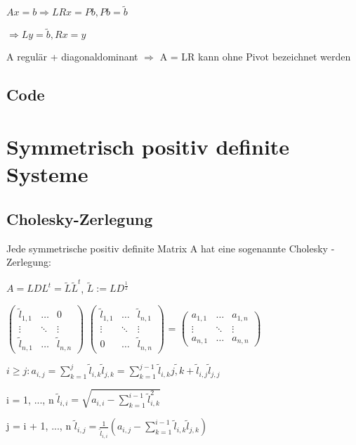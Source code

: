 \documentclass[12pt,a4paper]{article} %
\newcommand*\tab[1][1cm]{\hspace*{#1}}
\begin{document}
	$Ax = b \Rightarrow LRx = Pb, Pb = \tilde{b}$
	
	$\Rightarrow Ly = \tilde{b}, Rx = y$
	
	A regulär + diagonaldominant $\Rightarrow$ A = LR kann ohne Pivot bezeichnet werden
	
	\subsection{Code}
	
	\newpage
	
	\section{Symmetrisch positiv definite Systeme}
	
	\subsection{Cholesky-Zerlegung}
	
	Jede symmetrische positiv definite Matrix A hat eine sogenannte Cholesky - Zerlegung:
	
	$A = LDL^t = \tilde{L}\tilde{L}^t$, $\tilde{L} := LD^{\frac{1}{2}}$
	
	$\begin{pmatrix}
		\tilde{l}_{1,1} & \dots & 0 \\
		\vdots & \ddots & \vdots \\
		\tilde{l}_{n,1} & \dots & \tilde{l}_{n,n}
	\end{pmatrix}$
	$\begin{pmatrix}
		\tilde{l}_{1,1} & \dots & \tilde{l}_{n,1} \\
		\vdots & \ddots & \vdots \\
		0 & \dots & \tilde{l}_{n,n}
	\end{pmatrix}$
	=
	$\begin{pmatrix}
		a_{1,1} & \dots & a_{1, n} \\
		\vdots & \ddots & \vdots \\
		a_{n, 1} & \dots & a_{n, n}
	\end{pmatrix}$
	
	$i \ge j: a_{i, j} = \sum\limits_{k = 1}^j\tilde{l}_{i, k}\tilde{l}_{j, k} = \sum\limits_{k = 1}^{j - 1}\tilde{l}_{i, k}\tilde{j, k} + \tilde{l}_{i, j}\tilde{l}_{j, j}$
	
	i = 1, ..., n \tab $\tilde{l}_{i, i} = \sqrt{a_{i, i} - \sum\limits_{k = 1}^{i - 1}\tilde{l}_{i, k}^2}$
	
	j = i + 1, ..., n \tab $ \tilde{l}_{i, j} = \frac{1}{\tilde{l}_{i, i}}(a_{i, j} - \sum\limits_{k = 1}^{i - 1}\tilde{l}_{i, k}\tilde{l}_{j, k})$
	
\end{document}
